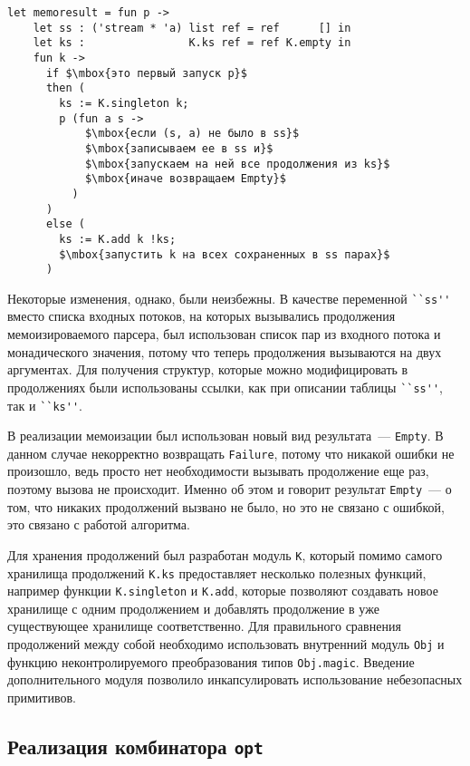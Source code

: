 \documentclass[conference]{IEEEtran}
\begin{document}
\begin{lstlisting}[basicstyle=\small]
  let memoresult = fun p ->
    let ss : ('stream * 'a) list ref = ref      [] in
    let ks :                K.ks ref = ref K.empty in
    fun k ->
      if $\mbox{это первый запуск p}$
      then (
        ks := K.singleton k;
        p (fun a s ->
            $\mbox{если (s, a) не было в ss}$
            $\mbox{записываем ее в ss и}$
            $\mbox{запускаем на ней все продолжения из ks}$
            $\mbox{иначе возвращаем Empty}$
          )
      )
      else (
        ks := K.add k !ks;
        $\mbox{запустить k на всех сохраненных в ss парах}$
      )
\end{lstlisting}

Некоторые изменения, однако, были неизбежны. В качестве переменной \lstinline|``ss''| вместо списка входных потоков, на которых вызывались продолжения мемоизироваемого парсера, был использован список
пар из входного потока и монадического значения, потому что теперь продолжения вызываются на двух аргументах. Для получения структур, которые можно модифицировать в продолжениях были
использованы ссылки, как при описании таблицы \lstinline|``ss''|, так и \lstinline|``ks''|.

В реализации мемоизации был использован новый вид результата~--- \lstinline|Empty|. В данном случае некорректно возвращать \lstinline|Failure|, потому что никакой ошибки не произошло,
ведь просто нет необходимости вызывать продолжение еще раз, поэтому вызова не происходит. Именно об этом и говорит результат \lstinline|Empty|~--- о том, что никаких продолжений
вызвано не было, но это не связано с ошибкой, это связано с работой алгоритма.

Для хранения продолжений был разработан модуль \lstinline|K|, который помимо самого хранилища продолжений \lstinline|K.ks| предоставляет несколько полезных функций, например
функции \lstinline|K.singleton| и  \lstinline|K.add|, которые позволяют создавать новое хранилище с одним продолжением и добавлять продолжение в уже существующее хранилище
соответственно. Для правильного сравнения продолжений между собой необходимо использовать внутренний модуль \lstinline|Obj| и функцию неконтролируемого преобразования типов
\lstinline|Obj.magic|. Введение дополнительного модуля позволило инкапсулировать использование небезопасных примитивов.

\subsection{Реализация комбинатора \lstinline|opt|}
\end{document}
